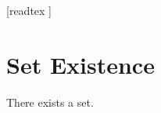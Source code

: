\documentclass[10pt]{article}
\begin{document}
  \begin{imports}
    \begin{forthel}
      [readtex ]
    \end{forthel}
  \end{imports}


  \section{Set Existence}

  \begin{forthel}
    \begin{axiom}
      There exists a set.
    \end{axiom}
  \end{forthel}
\end{document}

